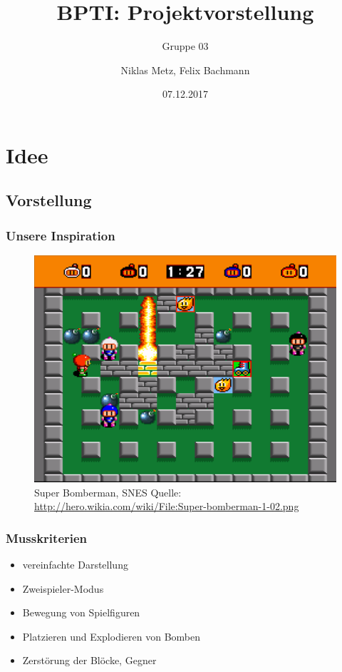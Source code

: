 \documentclass[18pt]{beamer}
\title[BPTI]{BPTI: Projektvorstellung}
\subtitle{Gruppe 03}
\author{Niklas Metz, Felix Bachmann}
\date{07.12.2017}
\institute{}
\begin{document}

\begin{frame}
\titlepage
\end{frame}

\section{Idee}
	\subsection{Vorstellung}
		\begin{frame}
			\frametitle{Unsere Inspiration}
			\begin{figure}[H]
				\centering
				\includegraphics[scale=0.35]{../bomberman.png}
				\centering
				\caption*{Super Bomberman, SNES \newline Quelle: \url{http://hero.wikia.com/wiki/File:Super-bomberman-1-02.png} }
			\end{figure}
		\end{frame}
		\begin{frame}
			\frametitle{Musskriterien}
			\begin{itemize}
				\item vereinfachte Darstellung
				\item Zweispieler-Modus
				\item Bewegung von Spielfiguren
				\item Platzieren und Explodieren von Bomben
				\item Zerstörung der Blöcke, Gegner
			\end{itemize}
		\end{frame}
\end{document}
